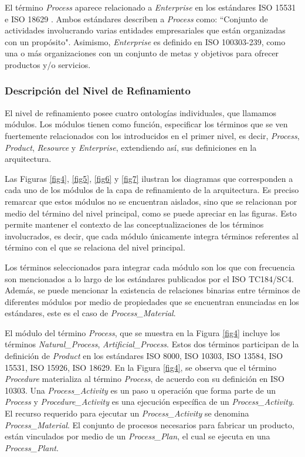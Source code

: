 \documentclass[journal]{IEEEtran}
\begin{document}
El t\'ermino \emph{Process} aparece relacionado a \emph{Enterprise} en los est\'andares ISO 15531 \cite{ISO2004} e ISO 18629 \cite{ISOPrinciplesc}. Ambos est\'andares describen a \emph{Process} como: ``Conjunto de actividades involucrando varias entidades empresariales que est\'an organizadas con un prop\'osito". Asimismo, \emph{Enterprise} es definido en ISO 100303-239, como una o m\'as organizaciones con un conjunto de metas y objetivos para ofrecer productos y/o servicios.

\subsubsection{Descripción del Nivel de Refinamiento}

El nivel de refinamiento posee cuatro ontolog\'ias individuales, que llamamos m\'odulos. Los m\'odulos tienen como funci\'on, especificar los t\'erminos que se ven fuertemente relacionados con los introducidos en el primer nivel, es decir, \emph{Process}, \emph{Product}, \emph{Resource} y \emph{Enterprise}, extendiendo as\'i, sus definiciones en la arquitectura.

Las Figuras \ref{fig4}, \ref{fig5}, \ref{fig6} y \ref{fig7} ilustran los diagramas que corresponden a cada uno de los m\'odulos de la capa de refinamiento de la arquitectura. Es preciso remarcar que estos m\'odulos no se encuentran aislados, sino que se relacionan por medio del t\'ermino del nivel principal, como se puede apreciar en las figuras. Esto permite mantener el contexto de las conceptualizaciones de los t\'erminos involucrados, es decir, que cada m\'odulo \'unicamente integra t\'erminos referentes al t\'ermino con el que se relaciona del nivel principal.

Los t\'erminos seleccionados para integrar cada m\'odulo son los que con frecuencia son mencionados a lo largo de los est\'andares publicados por el ISO TC184/SC4. Adem\'as, se puede mencionar la existencia de relaciones binarias entre t\'erminos de diferentes m\'odulos por medio de propiedades que se encuentran enunciadas en los est\'andares, este es el caso de \emph{Process\_Material}.

El m\'odulo del t\'ermino \emph{Process}, que se muestra en la Figura \ref{fig4} incluye los t\'erminos \emph{Natural\_Process}, \emph{Artificial\_Process}. Estos dos t\'erminos participan de la definici\'on de \emph{Product} en los est\'andares ISO 8000, ISO 10303, ISO 13584, ISO 15531, ISO 15926, ISO 18629. En la Figura \ref{fig4}, se observa que el t\'ermino \emph{Procedure} materializa al t\'ermino \emph{Process}, de acuerdo con su definici\'on en ISO 10303. Una \emph{Process\_Activity} es un paso u operaci\'on que forma parte de un \emph{Process} y \emph{Procedure\_Activity} es una ejecuci\'on espec\'ifica de un \emph{Process\_Activity}. El recurso requerido para ejecutar un \emph{Process\_Activity} se denomina \emph{Process\_Material}. El conjunto de procesos necesarios para fabricar un producto, est\'an vinculados por medio de un \emph{Process\_Plan}, el cual se ejecuta en una \emph{Process\_Plant}.
\end{document}

